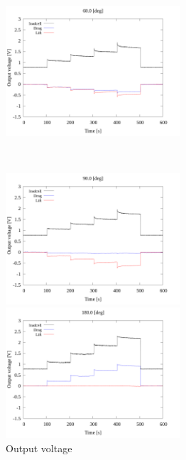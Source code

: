\begin{figure}[htbp]
\begin{minipage}[b]{0.45\linewidth}
            \centering
            \includegraphics[width=65mm]{../../02_workspace/result/2-1/plot/01-3_allsensors/01_allsensors_600.png}
          \end{minipage}\\
          \begin{minipage}[b]{0.45\linewidth}
            \centering
            \includegraphics[width=65mm]{../../02_workspace/result/2-1/plot/01-3_allsensors/01_allsensors_900.png}
          \end{minipage}
          \begin{minipage}[b]{0.45\linewidth}
            \centering
            \includegraphics[width=65mm]{../../02_workspace/result/2-1/plot/01-3_allsensors/01_allsensors_1800.png}
          \end{minipage} 
          \caption{Output voltage}
    \end{figure}

